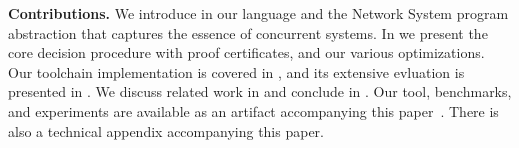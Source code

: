 \smallskip
\noindent
\textbf{Contributions.}
We introduce in   our \toolname{} language and the Network System program abstraction that captures the essence of concurrent systems.
    In  we present the core decision procedure with proof certificates, and our various optimizations.
    Our \toolname{} toolchain implementation is covered in , and its extensive evluation is presented in . 
%    
We discuss related work in  and conclude in .
%
Our tool, benchmarks, and experiments are available as an  artifact accompanying this paper~\cite{ArtifactRepository}.
% 
There is also a technical appendix accompanying this paper.